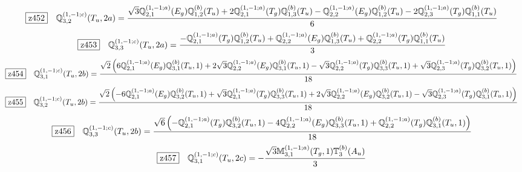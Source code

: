 \documentclass[fleqn,10pt,landscape]{jsarticle}
\begin{document}
\begin{dmath*}
\hspace*{3mm}\fbox{z452}\quad \mathbb{Q}_{3,2}^{(1,-1;c)}(T_{u},2a)=\frac{\sqrt{3} \mathbb{Q}_{2,1}^{(1,-1;a)}(E_{g}) \mathbb{Q}_{1,2}^{(b)}(T_{u}) + 2 \mathbb{Q}_{2,1}^{(1,-1;a)}(T_{g}) \mathbb{Q}_{1,3}^{(b)}(T_{u}) - \mathbb{Q}_{2,2}^{(1,-1;a)}(E_{g}) \mathbb{Q}_{1,2}^{(b)}(T_{u}) - 2 \mathbb{Q}_{2,3}^{(1,-1;a)}(T_{g}) \mathbb{Q}_{1,1}^{(b)}(T_{u})}{6}
\end{dmath*}
\begin{dmath*}
\hspace*{3mm}\fbox{z453}\quad \mathbb{Q}_{3,3}^{(1,-1;c)}(T_{u},2a)=\frac{- \mathbb{Q}_{2,1}^{(1,-1;a)}(T_{g}) \mathbb{Q}_{1,2}^{(b)}(T_{u}) + \mathbb{Q}_{2,2}^{(1,-1;a)}(E_{g}) \mathbb{Q}_{1,3}^{(b)}(T_{u}) + \mathbb{Q}_{2,2}^{(1,-1;a)}(T_{g}) \mathbb{Q}_{1,1}^{(b)}(T_{u})}{3}
\end{dmath*}
\begin{dmath*}
\hspace*{3mm}\fbox{z454}\quad \mathbb{Q}_{3,1}^{(1,-1;c)}(T_{u},2b)=\frac{\sqrt{2} \left(6 \mathbb{Q}_{2,1}^{(1,-1;a)}(E_{g}) \mathbb{Q}_{3,1}^{(b)}(T_{u},1) + 2 \sqrt{3} \mathbb{Q}_{2,2}^{(1,-1;a)}(E_{g}) \mathbb{Q}_{3,1}^{(b)}(T_{u},1) - \sqrt{3} \mathbb{Q}_{2,2}^{(1,-1;a)}(T_{g}) \mathbb{Q}_{3,3}^{(b)}(T_{u},1) + \sqrt{3} \mathbb{Q}_{2,3}^{(1,-1;a)}(T_{g}) \mathbb{Q}_{3,2}^{(b)}(T_{u},1)\right)}{18}
\end{dmath*}
\begin{dmath*}
\hspace*{3mm}\fbox{z455}\quad \mathbb{Q}_{3,2}^{(1,-1;c)}(T_{u},2b)=\frac{\sqrt{2} \left(- 6 \mathbb{Q}_{2,1}^{(1,-1;a)}(E_{g}) \mathbb{Q}_{3,2}^{(b)}(T_{u},1) + \sqrt{3} \mathbb{Q}_{2,1}^{(1,-1;a)}(T_{g}) \mathbb{Q}_{3,3}^{(b)}(T_{u},1) + 2 \sqrt{3} \mathbb{Q}_{2,2}^{(1,-1;a)}(E_{g}) \mathbb{Q}_{3,2}^{(b)}(T_{u},1) - \sqrt{3} \mathbb{Q}_{2,3}^{(1,-1;a)}(T_{g}) \mathbb{Q}_{3,1}^{(b)}(T_{u},1)\right)}{18}
\end{dmath*}
\begin{dmath*}
\hspace*{3mm}\fbox{z456}\quad \mathbb{Q}_{3,3}^{(1,-1;c)}(T_{u},2b)=\frac{\sqrt{6} \left(- \mathbb{Q}_{2,1}^{(1,-1;a)}(T_{g}) \mathbb{Q}_{3,2}^{(b)}(T_{u},1) - 4 \mathbb{Q}_{2,2}^{(1,-1;a)}(E_{g}) \mathbb{Q}_{3,3}^{(b)}(T_{u},1) + \mathbb{Q}_{2,2}^{(1,-1;a)}(T_{g}) \mathbb{Q}_{3,1}^{(b)}(T_{u},1)\right)}{18}
\end{dmath*}
\begin{dmath*}
\hspace*{3mm}\fbox{z457}\quad \mathbb{Q}_{3,1}^{(1,-1;c)}(T_{u},2c)=- \frac{\sqrt{3} \mathbb{M}_{3,1}^{(1,-1;a)}(T_{g},1) \mathbb{T}_{3}^{(b)}(A_{u})}{3}
\end{dmath*}
\end{document}
